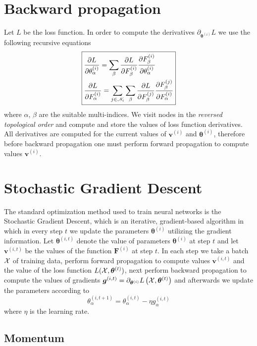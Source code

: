 \documentclass{myclass}
\begin{document}
\section{Backward propagation}

Let \(L\) be the loss function. In order to compute the derivatives
\(\partial_{\bm{\theta}^{(i)}}L\) we use the following recursive equations
\[
\boxed{
\begin{split} 
   &\pdv{L}{\theta^{(i)}_\alpha} = \sum_\beta \pdv{L}{F^{(i)}_\beta} \pdv{F^{(i)}_\beta}{\theta^{(i)}_\alpha} \\
   &\pdv{L}{F_\alpha^{(i)}} = \sum_{j \in \mathscr{N}_i} \sum_\beta \pdv{L}{F_\beta^{(j)}} \pdv{F_\beta ^{(j)}}{F_\alpha^{(i)}}
\end{split}
}
\] 
where \(\alpha\), \(\beta\) are the suitable multi-indices. We visit nodes in the \emph{reversed
topological order} and compute and store the values of loss function derivatives. All derivatives
are computed for the current values of \(\bm{v}^{(i)}\) and \(\bm{\theta}^{(i)}\), therefore before
backward propagation one must perform forward propagation to compute values \(\bm{v}^{(i)}\).


\section{Stochastic Gradient Descent}

The standard optimization method used to train neural networks is the Stochastic Gradient Descent,
which is an iterative, gradient-based algorithm in which in every step \(t\) we update the
parameters \(\bm{\theta}^{(i)}\) utilizing the gradient information. Let \(\bm{\theta}^{(i,t)}\)
denote the value of parameters \(\bm{\theta}^{(i)}\) at step \(t\) and let \(\bm{v}^{(i,t)}\) be the
values of the function \(\bm{F}^{(i)}\) at step \(t\). In each step we take a batch \(\mathcal{X}\)  of
training data, perform forward propagation to compute values \(\bm{v}^{(i,t)}\) and the value of the
loss function \(L(\mathcal{X},\bm{\theta}^{(t)})\), next perform backward propagation to compute the
values of gradients \(\bm{g}^{(i,t)} =
\partial_{\bm{\theta}^{(i)}}L\left(\mathcal{X},\bm{\theta}^{(t)}\right)\) and afterwards we update the
parameters according to
\[
   \boxed{ \theta_\alpha^{(i,t+1)} = \theta_\alpha^{(i,t)} - \eta g_\alpha^{(i,t)} }
\] 
where \(\eta\) is the learning rate.


\subsection{Momentum}
\end{document}
